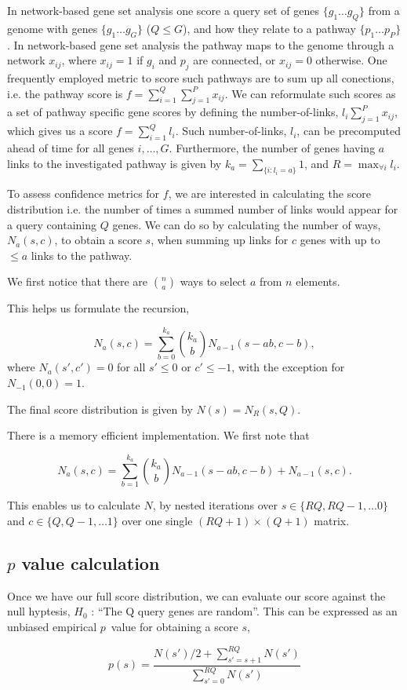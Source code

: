 \documentclass[11pt]{article}
\begin{document}
In network-based gene set analysis one score a query set of genes $ \{g_1 \ldots g_Q\} $ from a genome with genes $\{g_1 \ldots g_G\}$ ($Q \le G$), and how they relate to a pathway $\{p_1 \ldots p_P\}$. In network-based gene set analysis the pathway maps to the genome through a network ${x_{ij}}$, where $x_{ij}=1$ if $g_i$ and $p_j$ are connected, or $x_{ij}=0$ otherwise. One frequently employed metric to score such pathways are to sum up all conections, i.e. the pathway score is $f=\sum_{i=1}^Q\sum_{j=1}^P x_{ij}$.
We can reformulate such scores as a set of pathway specific gene scores by defining the number-of-links, $l_i\sum_{j=1}^P x_{ij}$, which gives us a score $f=\sum_{i=1}^Q l_i$.
Such number-of-links, $l_i$, can be precomputed ahead of time for all genes $i, \ldots, G$.
Furthermore, the number of genes having $a$ links to the investigated pathway is given by $k_a=\sum_{\{i:l_i=a\}}1$, and $R=\max_{\forall i}{l_i}$.

To assess confidence metrics for $f$, we are interested in calculating the score distribution i.e. the number of times a summed number of links would appear for a query containing $Q$ genes.
We can do so by calculating the number of ways, $N_a(s,c)$, to obtain a score $s$, when summing up links for $c$ genes with up to $\le a$ links to the pathway.

We first notice that there are $n\choose a$ ways to select $a$ from $n$ elements.

This helps us formulate the recursion,

\[
N_a(s,c)=\sum_{b=0}^{k_a}{k_a \choose b} N_{a-1}(s-ab,c-b),
\]
where $N_a(s',c')=0$ for all $s'\le 0$ or $c' \le -1$, with the exception for $N_{-1}(0,0)=1$.

The final score distribution is given by $N(s)=N_R(s,Q)$.

There is a memory efficient implementation. We first note that

\[
N_a(s,c)=\sum_{b=1}^{k_a}{k_a \choose b} N_{a-1}(s-ab,c-b) + N_{a-1}(s,c).
\]


This enables us to calculate $N$, by nested iterations over $s \in \{ RQ, RQ-1, \ldots 0 \}$ and $c \in \{ Q, Q-1, \ldots 1 \}$ over one single $(RQ+1) \times (Q+1)$ matrix.


\subsection*{$p$ value calculation}

Once we have our full score distribution, we can evaluate our score against the null hyptesis, $H_0$ : ``The Q query genes are random''. This can be expressed as an unbiased empirical $p$~value for obtaining a score $s$,

\[
p(s)=\frac{N(s')/2 +\sum_{s'=s+1}^{RQ} N(s')}{\sum_{s'=0}^{RQ} N(s')}
\]
\end{document}
